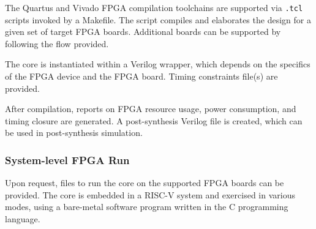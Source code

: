 %

The Quartus and Vivado FPGA compilation toolchains are supported via {\tt .tcl}
scripts invoked by a Makefile. The script compiles and elaborates the design for
a given set of target FPGA boards. Additional boards can be supported by
following the flow provided.

The core is instantiated within a Verilog wrapper, which depends on the
specifics of the FPGA device and the FPGA board. Timing constraints file(s) are
provided.

After compilation, reports on FPGA resource usage, power consumption, and timing
closure are generated. A post-synthesis Verilog file is created, which can be
used in post-synthesis simulation.



\subsubsection*{System-level FPGA Run}

Upon request, files to run the core on the supported FPGA boards can be
provided. The core is embedded in a RISC-V system and exercised in various
modes, using a bare-metal software program written in the C programming
language.
